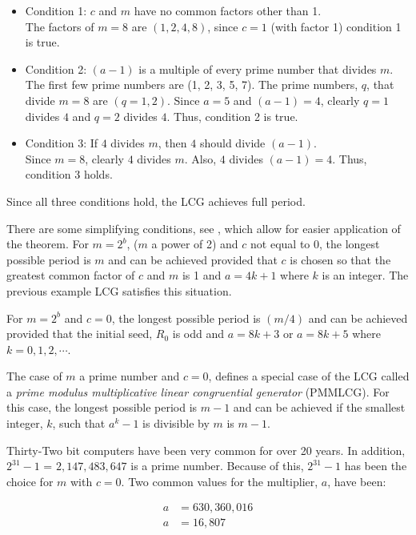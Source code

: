 \documentclass[
]{book}
\theoremstyle{definition}
\theoremstyle{definition}
\theoremstyle{definition}
\theoremstyle{definition}
\theoremstyle{remark}
\begin{document}
\begin{itemize}
\item
  Condition 1: \(c\) and \(m\) have no common factors other than 1.\\
  The factors of \(m=8\) are \((1, 2, 4, 8)\), since \(c=1\) (with factor 1)
  condition 1 is true.
\item
  Condition 2: \((a-1)\) is a multiple of every prime number that
  divides \(m\). The first few prime numbers are (1, 2, 3, 5, 7). The
  prime numbers, \(q\), that divide \(m=8\) are \((q =1, 2)\). Since \(a=5\)
  and \((a-1)=4\), clearly \(q = 1\) divides \(4\) and \(q = 2\) divides \(4\).
  Thus, condition 2 is true.
\item
  Condition 3: If \(4\) divides \(m\), then \(4\) should divide \((a-1)\).\\
  Since \(m=8\), clearly \(4\) divides \(m\). Also, \(4\) divides \((a-1)= 4\).
  Thus, condition 3 holds.
\end{itemize}

Since all three conditions hold, the LCG achieves full period.

There are some simplifying conditions, see \citet{banks2005discreteevent},
which allow for easier application of the theorem. For \(m = 2^{b}\), (\(m\)
a power of 2) and \(c\) not equal to 0, the longest possible period is \(m\)
and can be achieved provided that \(c\) is chosen so that the greatest
common factor of \(c\) and \(m\) is 1 and \(a=4k+1\) where \(k\) is an integer.
The previous example LCG satisfies this situation.

For \(m = 2^{b}\) and \(c = 0\), the longest possible period is \((m/4)\) and
can be achieved provided that the initial seed, \(R_{0}\) is odd and
\(a=8k + 3\) or \(a=8k + 5\) where \(k = 0, 1, 2,\cdots\).

The case of \(m\) a prime number and \(c = 0\), defines a special case of
the LCG called a \emph{prime modulus multiplicative linear congruential
generator} (PMMLCG). For this case, the longest possible period is \(m-1\)
and can be achieved if the smallest integer, \(k\), such that \(a^{k} -1\)
is divisible by \(m\) is \(m-1\).

Thirty-Two bit computers have been very common for over 20 years. In
addition, \(2^{31} - 1\) = \(2,147,483,647\) is a prime number. Because of
this, \(2^{31} - 1\) has been the choice for \(m\) with \(c=0\). Two common
values for the multiplier, \(a\), have been:

\[
\begin{split}
a & = 630,360,016\\
a & = 16,807\\
\end{split}
\]
\end{document}
